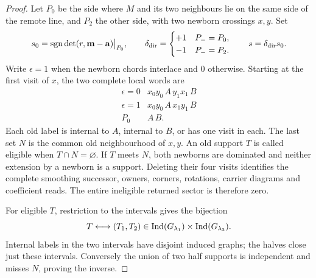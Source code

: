 \begin{proof}
Let $P_0$ be the side where $M$ and its two neighbours lie on the same
side of the remote line, and $P_2$ the other side, with two newborn
crossings $x,y$.  Set
\begin{equation}\label{s7c:bigon-signs}
 s_0=\operatorname{sgn}\det(r,\mathbf m-\mathbf a)\big|_{P_0},\qquad
 \delta_{\rm dir}=\begin{cases}+1&P_- =P_0,\\-1&P_-=P_2.
 \end{cases}
 \qquad s=\delta_{\rm dir}s_0.
\end{equation}
Write $\epsilon=1$ when the newborn chords interlace and $0$ otherwise.
Starting at the first visit of $x$, the two complete local words are
\begin{equation}\label{s7c:bigon-words-eq}
 \begin{array}{c|l}
 \epsilon=0&x_0y_0\,A\,y_1x_1\,B\\
 \epsilon=1&x_0y_0\,A\,x_1y_1\,B\\
 P_0&A\,B.
 \end{array}
\end{equation}
Each old label is internal to $A$, internal to $B$, or has one visit in
each.  The last set $N$ is the common old neighbourhood of $x,y$.
An old support $T$ is called eligible when $T\cap N=\varnothing$.
If $T$ meets $N$, both newborns are dominated and neither extension
by a newborn is a support.  Deleting their four visits identifies the
complete smoothing successor, owners, corners, rotations, carrier
diagrams and coefficient reads.  The entire ineligible returned sector
is therefore zero.

For eligible $T$, restriction to the intervals gives the bijection
\begin{equation}\label{s7c:eligible-bijection}
 T\longleftrightarrow(T_1,T_2)\in
 \operatorname{Ind}(G_{\lambda_1})\times\operatorname{Ind}(G_{\lambda_2}).
\end{equation}
Internal labels in the two intervals have disjoint induced graphs;
the halves close just these intervals.  Conversely the union of two
half supports is independent and misses $N$, proving the inverse.


\end{proof}
